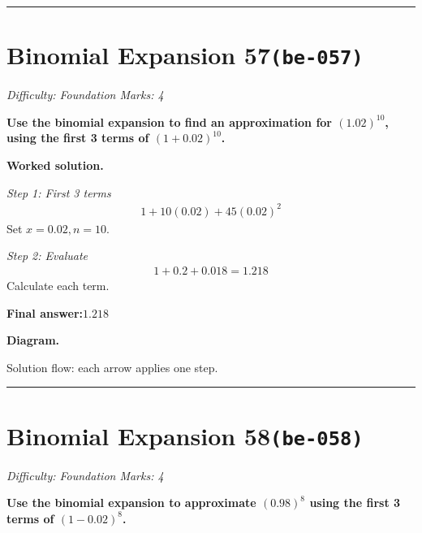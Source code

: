 \documentclass[11pt]{article}
\newcommand{\question}[1]{\par\medskip\noindent\textbf{#1}\par}
\begin{document}
\medskip\hrule

\section*{Binomial Expansion 57\quad\small\texttt{(be-057)}}
\textit{Difficulty: Foundation \quad\textbar\quad Marks: 4}

\question{Use the binomial expansion to find an approximation for \( (1.02)^{10} \), using the first 3 terms of \( (1 + 0.02)^{10} \).}

\textbf{Worked solution.}

\textit{Step 1: First 3 terms}
\[\begin{gathered}
1 + 10(0.02) + 45(0.02)^2
\end{gathered}\]
Set \( x = 0.02, n = 10 \).

\textit{Step 2: Evaluate}
\[\begin{gathered}
1 + 0.2 + 0.018 = 1.218
\end{gathered}\]
Calculate each term.

\begin{answerbox}
\textbf{Final answer:}\quad \(\displaystyle 1.218\)
\end{answerbox}
\textbf{Diagram.}

\begin{center}
\end{center}
\small Solution flow: each arrow applies one step.\normalsize

\medskip\hrule

\section*{Binomial Expansion 58\quad\small\texttt{(be-058)}}
\textit{Difficulty: Foundation \quad\textbar\quad Marks: 4}

\question{Use the binomial expansion to approximate \( (0.98)^8 \) using the first 3 terms of \( (1 - 0.02)^8 \).}
\end{document}
